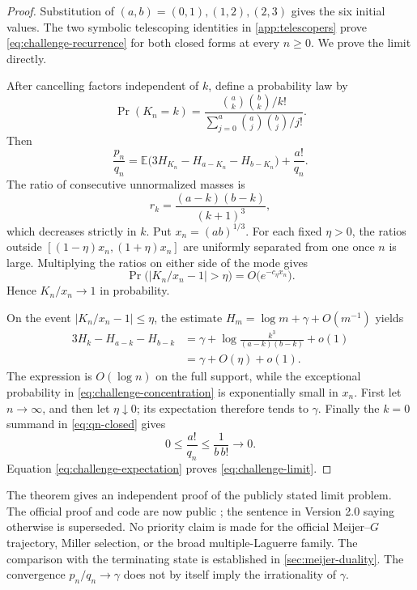 \begin{proof}
Substitution of \((a,b)=(0,1),(1,2),(2,3)\) gives the six initial
values.  The two symbolic telescoping identities in
\cref{app:telescopers} prove \eqref{eq:challenge-recurrence} for both
closed forms at every \(n\ge0\).  We prove the limit directly.

After cancelling factors independent of \(k\), define a probability law by
\begin{equation}\label{eq:challenge-pmf}
 \Pr(K_n=k)=
 \frac{\binom ak\binom bk/k!}
 {\sum_{j=0}^{a}\binom aj\binom bj/j!}.
\end{equation}
Then
\begin{equation}\label{eq:challenge-expectation}
 \frac{p_n}{q_n}
 =\mathbb E\bigl(3H_{K_n}-H_{a-K_n}-H_{b-K_n}\bigr)
 +\frac{a!}{q_n}.
\end{equation}
The ratio of consecutive unnormalized masses is
\begin{equation}\label{eq:challenge-ratio}
 r_k=\frac{(a-k)(b-k)}{(k+1)^3},
\end{equation}
which decreases strictly in \(k\).  Put \(x_n=(ab)^{1/3}\).  For each
fixed \(\eta>0\), the ratios outside
\([(1-\eta)x_n,(1+\eta)x_n]\) are uniformly separated from one once
\(n\) is large.  Multiplying the ratios on either side of the mode gives
\begin{equation}\label{eq:challenge-concentration}
 \Pr\bigl(|K_n/x_n-1|>\eta\bigr)
 =O\bigl(e^{-c_\eta x_n}\bigr).
\end{equation}
Hence \(K_n/x_n\to1\) in probability.

On the event \(|K_n/x_n-1|\le\eta\), the estimate
\(H_m=\log m+\gamma+O(m^{-1})\) yields
\begin{align*}
 3H_k-H_{a-k}-H_{b-k}
 &=\gamma+\log\frac{k^3}{(a-k)(b-k)}+o(1)\\
 &=\gamma+O(\eta)+o(1).
\end{align*}
The expression is \(O(\log n)\) on the full support, while the exceptional
probability in \eqref{eq:challenge-concentration} is exponentially small in
\(x_n\).  First let \(n\to\infty\), and then let \(\eta\downarrow0\); its
expectation therefore tends to \(\gamma\).  Finally the
\(k=0\) summand in \eqref{eq:qn-closed} gives
\[
 0\le\frac{a!}{q_n}\le\frac1{b\,b!}\longrightarrow0.
\]
Equation \eqref{eq:challenge-expectation} proves
\eqref{eq:challenge-limit}.
\end{proof}

\begin{remark}
The theorem gives an independent proof of the publicly stated limit problem.
The official proof and code are now public \cite{RamanujanOfficial2026}; the
sentence in Version 2.0 saying otherwise is superseded.  No priority claim is
made for the official Meijer--\(G\) trajectory, Miller selection, or the broad
multiple-Laguerre family.  The comparison with the terminating state is
established in \cref{sec:meijer-duality}.
The convergence \(p_n/q_n\to\gamma\) does not by itself imply the
irrationality of \(\gamma\).
\end{remark}

